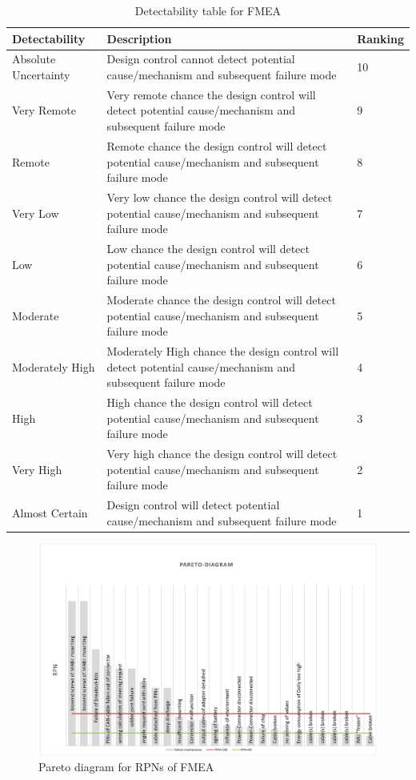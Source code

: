 \documentclass[ExampleMasters.tex]{subfiles}
\begin{document}
\begin{table}[h]
	\centering
	\caption[Detectability table for \acrshort{FMEA}]{Detectability table for \acrshort{FMEA} \cite{FMEA_tables}}
	\label{tab:fmea_detectability}
	\begin{tabular}{p{4cm}|p{9cm}|p{2cm}|}
		Detectability & Description & Ranking   \\ \hline
		Absolute Uncertainty & Design control cannot detect potential cause/mechanism and
		subsequent failure mode & 10        \\
		Very Remote &  Very remote chance the design control will detect potential
		cause/mechanism and subsequent failure mode & 9    \\
		Remote &  Remote chance the design control will detect potential
		cause/mechanism and subsequent failure mode & 8       \\
		Very Low & Very low chance the design control will detect potential
		cause/mechanism and subsequent failure mode & 7   \\
		Low &  Low chance the design control will detect potential
		cause/mechanism and subsequent failure mode & 6  \\
		Moderate & Moderate chance the design control will detect potential
		cause/mechanism and subsequent failure mode & 5  \\
		Moderately High & Moderately High chance the design control will detect
		potential cause/mechanism and subsequent failure mode & 4 \\
	High & High chance the design control will detect potential
	cause/mechanism and subsequent failure mode & 3 \\
	Very High	& Very high chance the design control will detect potential
	cause/mechanism and subsequent failure mode & 2 \\
		Almost Certain & Design control will detect potential cause/mechanism and
		subsequent failure mode & 1 \\
	\end{tabular}	


\end{table}
 
\begin{figure}[!htb]
	\centering
	\includegraphics[width=1.0\linewidth]{figures/Pareto}
	\caption{Pareto diagram for \acrshort{RPN}s of \acrshort{FMEA}}
	\label{fig:pareto}
\end{figure}
\end{document}
